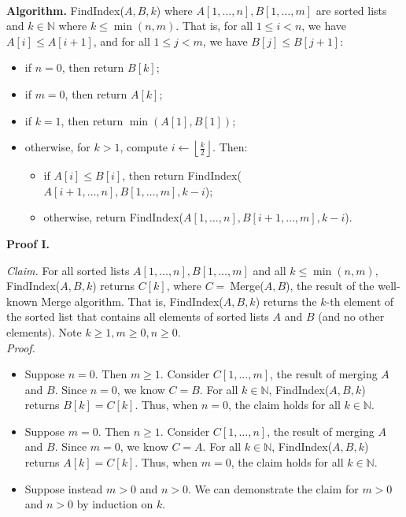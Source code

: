 \begin{solution}\\

\noindent\textbf{Algorithm. }{\sc FindIndex}($A,B,k$) where $A[1,\dots,n],B[1,\dots,m]$ are sorted lists and $k\in\mathbb{N}$ where $k\leq\min(n,m)$. That is, for all $1\leq i<n$, we have $A[i]\leq A[i+1]$, and for all $1\leq j<m$, we have $B[j]\leq B[j+1]$:
\begin{itemize}
\item if $n=0$, then return $B[k]$;
\item if $m=0$, then return $A[k]$;
\item if $k=1$, then return $\min(A[1],B[1])$;
\item otherwise, for $k>1$, compute $i\leftarrow\left\lfloor\frac{k}{2}\right\rfloor$. Then:
\begin{itemize}
\item if $A[i]\leq B[i]$, then return {\sc FindIndex}($A[i+1,\dots,n],B[1,\dots,m],k-i$);
\item otherwise, return {\sc FindIndex}($A[1,\dots,n],B[i+1,\dots,m],k-i$).
\end{itemize}
\end{itemize}

\noindent\textbf{Proof I.}

\noindent\textit{Claim. }For all sorted lists $A[1,\dots,n],B[1,\dots,m]$ and all $k\leq\min(n,m)$, {\sc FindIndex}($A,B,k$) returns $C[k]$, where $C=~${\sc Merge}($A,B$), the result of the well-known {\sc Merge} algorithm. That is, {\sc FindIndex}($A,B,k$) returns the $k$-th element of the sorted list that contains all elements of sorted lists $A$ and $B$ (and no other elements). Note $k\geq 1,m\geq 0,n\geq 0$.\\

\noindent\textit{Proof.}
\begin{itemize}
\item Suppose $n=0$. Then $m\geq 1$. Consider $C[1,\dots,m]$, the result of merging $A$ and $B$. Since $n=0$, we know $C=B$. For all $k\in\mathbb{N}$, {\sc FindIndex}($A,B,k$) returns $B[k]=C[k]$. Thus, when $n=0$, the claim holds for all $k\in\mathbb{N}$.
\item Suppose $m=0$. Then $n\geq 1$. Consider $C[1,\dots,n]$, the result of merging $A$ and $B$. Since $m=0$, we know $C=A$. For all $k\in\mathbb{N}$, {\sc FindIndex}($A,B,k$) returns $A[k]=C[k]$. Thus, when $m=0$, the claim holds for all $k\in\mathbb{N}$.
\item Suppose instead $m>0$ and $n>0$. We can demonstrate the claim for $m>0$ and $n>0$ by induction on $k$.\\


\end{itemize}
\end{solution}
